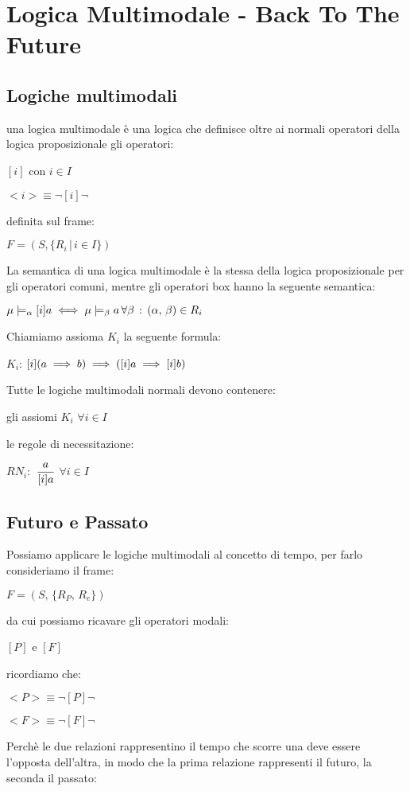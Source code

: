 
\chapter{Logica Multimodale - Back To The Future}


\section{Logiche multimodali}

una logica multimodale è una logica che definisce oltre ai normali
operatori della logica proposizionale gli operatori:

$[i]$ con $i\in I$

$<i>\equiv\neg[i]\neg$

definita sul frame:

$F=(S,\{R_{i}\,|\, i\in I\})$ 

La semantica di una logica multimodale è la stessa della logica proposizionale
per gli operatori comuni, mentre gli operatori box hanno la seguente
semantica:

$\mu\models_{\alpha}[i]a\iff\mu\models_{\beta}a\,\forall\beta\,:\,(\alpha,\,\beta)\in R_{i}$

Chiamiamo assioma $K_{i}$ la seguente formula:

$K_{i}$: $[i](a\implies b)\implies([i]a\implies[i]b)$

Tutte le logiche multimodali normali devono contenere:

gli assiomi $K_{i}$ $\forall i\in I$

le regole di necessitazione:

$RN_{i}:$ $\dfrac{a}{[i]a}$ $\forall i\in I$


\section{Futuro e Passato}

Possiamo applicare le logiche multimodali al concetto di tempo, per
farlo consideriamo il frame:

$F=(S,\,\{R_{P},\, R_{e}\})$

da cui possiamo ricavare gli operatori modali:

$[P]$ e $[F]$

ricordiamo che:

$<P>\equiv\neg[P]\neg$

$<F>\equiv\neg[F]\neg$

Perchè le due relazioni rappresentino il tempo che scorre una deve
essere l'opposta dell'altra, in modo che la prima relazione rappresenti
il futuro, la seconda il passato:

